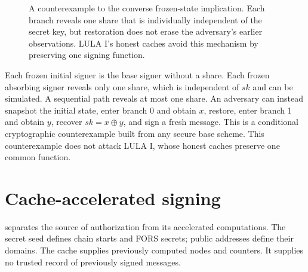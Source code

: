 \documentclass[a4paper,envcountsame,runningheads]{llncs}
\begin{document}
\begin{figure}[!htbp]
\centering
{}
\caption{A counterexample to the converse frozen-state implication. Each branch reveals one share that is individually independent of the secret key, but restoration does not erase the adversary's earlier observations. LULA I's honest caches avoid this mechanism by preserving one signing function.}\label{fig:branches}
\end{figure}

Each frozen initial signer is the base signer without a share. Each frozen absorbing signer reveals only one share, which is independent of $sk$ and can be simulated. A sequential path reveals at most one share. An adversary can instead snapshot the initial state, enter branch 0 and obtain $x$, restore, enter branch 1 and obtain $y$, recover $sk=x\oplus y$, and sign a fresh message. This is a conditional cryptographic counterexample built from any secure base scheme. This counterexample does not attack LULA I, whose honest caches preserve one common function.


\FloatBarrier

\section{Cache-accelerated signing}\label{sec:cache}
 separates the source of authorization from its accelerated computations. The secret seed defines chain starts and FORS secrets; public addresses define their domains. The cache supplies previously computed nodes and counters. It supplies no trusted record of previously signed messages.
\end{document}
